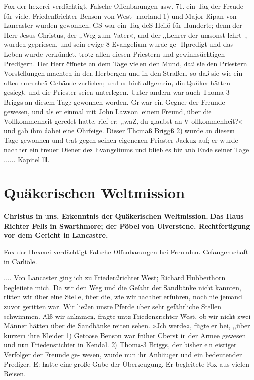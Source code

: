 Fox der hexerei verdächtigt. Falsche Offenbarungen usw. 71.
ein Tag der Freude für viele. Friedenßrichter Benson von West-
morland 1) und Major Ripan von Lancaster wurden gewonnen.
GS war ein Tag deS Heilö für Hunderte; denn der Herr Jesus
Christus, der ,,Weg zum Vater«, und der ,,Lehrer der umsonst
lehrt--, wurden gepriesen, und sein ewige-8 Evangelium wurde ge-
Hpredigt und das Leben wurde verkündet, trotz allen diesen Priestern
und gewinnsüchtigen Predigern. Der Herr öffnete an dem Tage
vielen den Mund, daß sie den Priestern Vorstellungen machten
in den Herbergen und in den Straßen, so daß sie wie ein altes
morscheö Gebäude zerfielen; und es hieß allgemein, die Quäker
hätten gesiegt, und die Priester seien unterlegen. Unter andern
war auch Thoma-3 Briggs an diesem Tage gewonnen worden. Gr
war ein Gegner der Freunde gewesen, und als er einmal mit
John Lawson, einem Freund, über die Vollkommenheit geredet hatte,
rief er: ,,waZ, du glaubst an V-ollkommenheit?« und gab ihm dabei
eine Ohrfeige. Dieser Thomaß Briggß 2) wurde an diesem Tage
gewonnen und trat gegen seinen eigenenen Priester Jackuz auf; er
wurde nachher ein treuer Diener dez Evangeliums und blieb es
biz anö Ende seiner Tage ......
Kapitel lll.


\chapter[Quäkerischen Weltmission]{Quäkerischen Weltmission}

\begin{center}
\textbf{Christus in uns. Erkenntnis der Quäkerischen Weltmission. Das
Haus Richter Fells in Swarthmore; der Pöbel von Ulverstone.
Rechtfertigung vor dem Gericht in Lancastre.}
\end{center}

Fox der Hexerei verdächtigt Falsche Offenbarungen bei Freunden.
Gefangenschaft in Carliöle.


.... Von Lancaster ging ich zu Friedenßrichter West; Richard
Hubberthorn begleitete mich. Da wir den Weg und die Gefahr
der Sandbänke nicht kannten, ritten wir über eine Stelle, über
die, wie wir nachher erfuhren, noch nie jemand zuvor geritten
war. Wir ließen unsre Pferde über sehr gefährliche Stellen
schwimmen. Alß wir ankamen, fragte untz Friedenzrichter West,
ob wir nicht zwei Männer hätten über die Sandbänke reiten
sehen. »Jch werde«, fügte er bei, ,,über kurzem ihre Kleider
1) Getoase Benson war früher Oberst in der Armee gewesen und nun
Friedenstichter in Kendal.
2) Thoma-3 Briggs, der bisher ein eisriger Verfolger der Freunde ge-
wesen, wurde nun ihr Anhiiuger und ein bedeutender Prediger. E: hatte eine
große Gabe der Überzeugung. Er begleitete Fox aus vielen Reisen.


